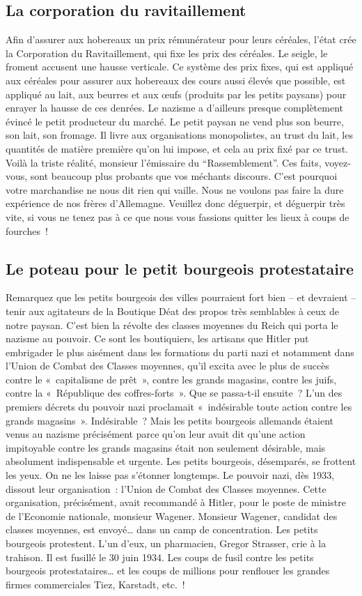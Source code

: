 \documentclass[french,twoside]{book} %
\begin{document}
\subsection[La corporation du ravitaillement]{La corporation du ravitaillement}
\noindent Afin d’assurer aux hobereaux un prix rémunérateur pour leurs céréales, l’état crée la Corporation du Ravitaillement, qui fixe les prix des céréales. Le seigle, le froment accusent une hausse verticale. Ce système des prix fixes, qui est appliqué aux céréales pour assurer aux hobereaux des cours aussi élevés que possible, est appliqué au lait, aux beurres et aux œufs (produits par les petits paysans) pour enrayer la hausse de ces denrées. Le nazisme a d’ailleurs presque complètement évincé le petit producteur du marché. Le petit paysan ne vend plus son beurre, son lait, son fromage. Il livre aux organisations monopolistes, au trust du lait, les quantités de matière première qu’on lui impose, et cela au prix fixé par ce trust. Voilà la triste réalité, monsieur l’émissaire du “Rassemblement”. Ces faits, voyez-vous, sont beaucoup plus probants que vos méchants discours. C’est pourquoi votre marchandise ne nous dit rien qui vaille. Nous ne voulons pas faire la dure expérience de nos frères d’Allemagne. Veuillez donc déguerpir, et déguerpir très vite, si vous ne tenez pas à ce que nous vous fassions quitter les lieux à coups de fourches !
\subsection[Le poteau pour le petit bourgeois protestataire]{Le poteau pour le petit bourgeois protestataire}
\noindent Remarquez que les petits bourgeois des villes pourraient fort bien – et devraient – tenir aux agitateurs de la Boutique Déat des propos très semblables à ceux de notre paysan. C’est bien la révolte des classes moyennes du Reich qui porta le nazisme au pouvoir. Ce sont les boutiquiers, les artisans que Hitler put embrigader le plus aisément dans les formations du parti nazi et notamment dans l’Union de Combat des Classes moyennes, qu’il excita avec le plus de succès contre le « capitalisme de prêt », contre les grands magasins, contre les juifs, contre la « République des coffres-forts ». Que se passa-t-il ensuite ? L’un des premiers décrets du pouvoir nazi proclamait « indésirable toute action contre les grands magasins ». Indésirable ? Mais les petits bourgeois allemands étaient venus au nazisme précisément parce qu’on leur avait dit qu’une action impitoyable contre les grands magasins était non seulement désirable, mais absolument indispensable et urgente. Les petits bourgeois, désemparés, se frottent les yeux. On ne les laisse pas s’étonner longtemps. Le pouvoir nazi, dès 1933, dissout leur organisation : l’Union de Combat des Classes moyennes. Cette organisation, précisément, avait recommandé à Hitler, pour le poste de ministre de l’Economie nationale, monsieur Wagener. Monsieur Wagener, candidat des classes moyennes, est envoyé… dans un camp de concentration. Les petits bourgeois protestent. L’un d’eux, un pharmacien, Gregor Strasser, crie à la trahison. Il est fusillé le 30 juin 1934. Les coups de fusil contre les petits bourgeois protestataires… et les coups de millions pour renflouer les grandes firmes commerciales Tiez, Karstadt, etc. !
\end{document}
